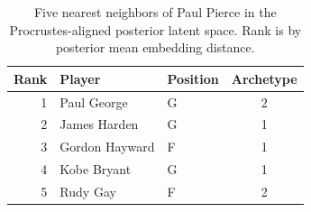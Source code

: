 \begin{table}[htbp]
  \centering\small
  \begin{tabular}{rllc}
    \toprule
    Rank & Player & Position & Archetype \\
    \midrule
    1 & Paul George & G & 2 \\
    2 & James Harden & G & 1 \\
    3 & Gordon Hayward & F & 1 \\
    4 & Kobe Bryant & G & 1 \\
    5 & Rudy Gay & F & 2 \\
    \bottomrule
  \end{tabular}
  \caption{Five nearest neighbors of Paul Pierce in the Procrustes-aligned posterior latent space. Rank is by posterior mean embedding distance.}
  \label{tab:Paul_Pierce_neighbors}
\end{table}

